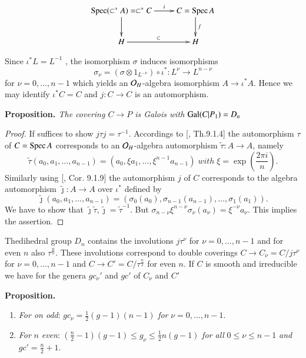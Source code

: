 $$
\xymatrix{
\Spec(\subset^{*} A)= \subset^{*} C \ar[r]^-{i}\ar[d] & C= \Spec A\ar[d]^-{f}\\ 
H \ar[r]^-{\subset} &  H
}
$$

Since $\iota^{*} L =L^{-1}$ , the isomorphism $\sigma $ induces isomorphisms
$$
\sigma_{\nu} = (\sigma \otimes 1_{L^{-\nu}}) \circ \iota^{*} : L^{\nu} \rightarrow L^{n-\nu}
$$
for $\nu = 0,\ldots,n-1$ which yields an  $\mathcal{O}_{H}$-algebra isomorphism $A \rightarrow \iota^{*}A$.
Hence we may identify $\iota^{*}C =C$ and $j:C \rightarrow C$ is an automorphism.

\medskip
\noindent
{\bfseries {} Proposition. \label{chap11-pro-2.1}} \textit{The covering $C\rightarrow P$ is Galois with $\operatorname{Gal}(C|P_{1}) =D_{n}$}

\begin{proof}
If suffices to show $j\tau j =\tau^{-1}$. Accordings to [\cite{chap11-keyEGAI}, Th.9.1.4] the automorphism $\tau$ of $C=\operatorname{Spec} A$ corresponds to an $\mathcal{O}_{H}$-algebra automorphism $\tilde{\tau}: A\rightarrow A$, namely
$$
\tilde{\tau}(a_{0}, a_{1}, \ldots, a_{n-1}) =(a_{0}, \xi a_{1}, \ldots, \xi^{n-1}a_{n-1})\; with \;\xi = \exp \left(\frac{2\pi i}{n}\right).
$$ 
Similarly using [\cite{chap11-keyEGAI}, Cor. 9.1.9] the automorphism $j$ of $C$ corresponds to the algebra automorphism $\tilde{\jmath} : A\rightarrow A$ over $\iota^{*}$ defined by
$$
\tilde{\jmath} (a_{0}, a_{1}, \ldots, a_{n-1}) = (\sigma_{0}(a_{0}), \sigma_{n-1}(a_{n-1}), \ldots, \sigma_{1}(a_{1})).
$$
We have to show that $\tilde{\jmath}\tilde{\tau}, \tilde{\jmath} = \tilde{\tau}^{-1}$. But $\sigma_{n-\nu}\xi^{n-\nu}\sigma_{\nu}(a_{\nu}) = \xi^{-\nu}a_{\nu}$. This implies the assertion.
\end{proof}

\noindent
The\pageoriginale dihedral group $D_{n}$ contains the involutions $j\tau^{\nu}$ for $\nu = 0,\ldots,n-1$ and for even $n$ also $\tau^{\frac{n}{n}}$. These involutions correspond to double coverings $C\rightarrow C_{\nu} = C/j\tau^{\nu}$ for $\nu =0, \ldots,n-1$ and $C\rightarrow C'= C/\tau^{\frac{n}{2}}$ for even $n$. If $C$ is smooth and irreducible we have for the genera $gc_{\nu}'$ and $gc'$ of $C_{\nu}$ and $C'$ 

\medskip
\noindent
{\bfseries {} Proposition.\label{chap11-prop-2.2}}
~

\begin{enumerate}[{\it a)}]
 \item \textit{For on odd}: $gc_{\nu} = \frac{1}{2}(g-1)(n-1)$ \textit{for} $\nu =0,\ldots,
  n-1$.\label{chap11-prop2.2-enum-1}
 \item \textit{For} $n$ \textit{even}: $(\frac{n}{2}-1)(g-1) \leq g_{\nu}\leq \frac{1}{2}n(g-1)$ \textit{for all} $0 \leq \nu \leq n-1$ \textit{and} $gc' =\frac{n}{2}+1$.\label{chap11-prop2.2-enum-2}
\end{enumerate}

